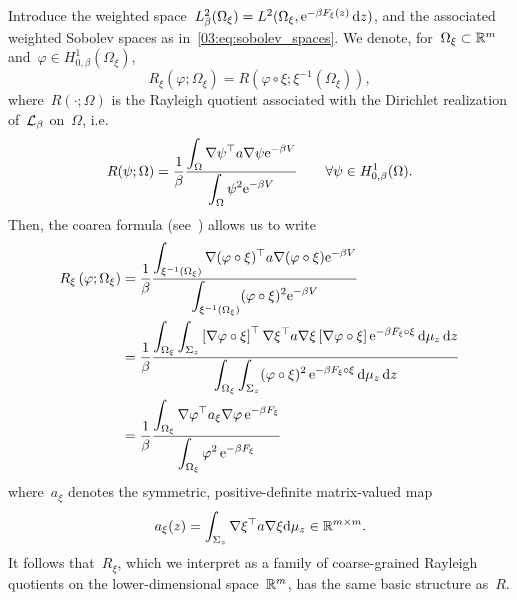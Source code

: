     Introduce the weighted space~$L_{\beta}^2(\Omega_\xi) = L^2(\Omega_\xi,\mathrm{e}^{-\beta F_\xi(z)}\,\mathrm{d} z)$, and the associated weighted Sobolev spaces as in~\eqref{03:eq:sobolev_spaces}. We denote, for~$\Omega_\xi\subset\mathbb{R}^m$ and~$\varphi\in H_{0,\beta}^1(\Omega_\xi)$,
    \begin{equation}
        R_\xi\left(\varphi;\Omega_\xi\right) = R\left(\varphi\circ\xi;\xi^{-1}(\Omega_\xi)\right),
    \end{equation}
    where~$R(\cdot;\Omega)$ is the Rayleigh quotient associated with the Dirichlet realization of~$\mathcal{L}_\beta$ on~$\Omega$, i.e.
    \begin{equation}
        R(\psi;\Omega) = \frac1\beta\frac{\displaystyle\int_{\Omega}\nabla\psi^\top a \nabla\psi\mathrm{e}^{-\beta V}}{\displaystyle\int_{\Omega}\psi^2\mathrm{e}^{-\beta V}}\qquad\forall\psi\in H_{0,\beta}^1(\Omega).
    \end{equation}
    Then, the coarea formula (see~\cite[Corollary 5.2.6]{KP08}) allows us to write
    \begin{equation}
        \label{03:eq:coarea_computation}
        \begin{aligned}
            R_\xi\left(\varphi;\Omega_\xi\right) &= \frac1\beta\frac{\displaystyle\int_{\xi^{-1}(\Omega_\xi)}\nabla(\varphi\circ\xi)^\top a\nabla(\varphi\circ\xi)\mathrm{e}^{-\beta V}}{\displaystyle\int_{\xi^{-1}(\Omega_\xi)}(\varphi\circ\xi)^2\mathrm{e}^{-\beta V}}\\
            &=\frac1\beta\frac{\displaystyle\int_{\Omega_\xi}\displaystyle\int_{\Sigma_z}{\left[\nabla\varphi\circ\xi\right]^\top\nabla\xi^\top a\nabla\xi\left[\nabla\varphi\circ\xi\right]}\,\mathrm{e}^{-\beta F_\xi\circ\xi}\,\mathrm{d}\mu_z\,\mathrm{d} z}{\displaystyle\int_{\Omega_\xi}\displaystyle\int_{\Sigma_z}(\varphi\circ \xi)^2\,\mathrm{e}^{-\beta F_\xi\circ \xi}\,\mathrm{d}\mu_z\,\mathrm{d} z}\\
            &=\frac1\beta\frac{\displaystyle\int_{\Omega_\xi}\nabla\varphi^\top a_\xi \nabla \varphi\,\mathrm{e}^{-\beta F_\xi}}{\displaystyle\int_{\Omega_\xi}\varphi^2\,\mathrm{e}^{-\beta F_\xi}}\\
        \end{aligned}
    \end{equation}
    where~$a_\xi$ denotes the symmetric, positive-definite matrix-valued map
    \begin{equation}
        \label{03:eq:diffusion_tensor}
        a_\xi(z) = \displaystyle\int_{\Sigma_z}{\nabla\xi^\top a\nabla\xi}\mathrm{d}\mu_z \in \mathbb{R}^{m\times m}.
    \end{equation}
    It follows that~$R_\xi$, which we interpret as a family of coarse-grained Rayleigh quotients on the lower-dimensional space~$\mathbb{R}^m$, has the same basic structure as~$R$.
